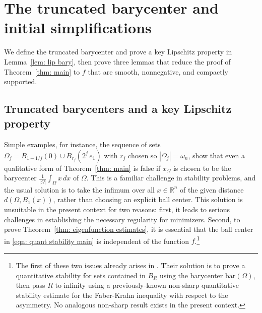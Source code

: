 \documentclass[10pt,a4paper]{amsart}
\numberwithin{equation}{section}
\def\R{{\mathbb R}}
\def\W{\Omega}
\def\om{\omega}
\begin{document}
\section{The truncated barycenter and initial simplifications}\label{sec: more preliminaries}
We define the truncated barycenter and prove a key Lipschitz property in Lemma~\ref{lem: lip bary}, then prove three lemmas that reduce the proof of  Theorem~\ref{thm: main} to $f$ that are smooth, nonnegative, and compactly supported.

 \subsection{Truncated barycenters and a key Lipschitz property}\label{sec: truncated barycenter}
\label{ssec: lip bary}
%
%
%
%
Simple examples, for instance, the sequence of sets $\Omega_j = B_{1-1/j}(0) \cup B_{r_j}(2^j\,e_1)$ with $r_j$  chosen so $|\Omega_j|= \om_n$,  show that even a qualitative form of Theorem~\ref{thm: main} is false if $x_\W$ is chosen to be the barycenter $ \tfrac{1}{|\W|}\int_\W x \,dx$ of $\W$.
This is a familiar challenge in stability problems, and the usual solution is to take the infimum over all $x \in \R^n$ of the given distance $d(\W, B_1(x))$, rather than choosing an explicit ball center. This solution is unsuitable in the present context for two reasons: first, it leads to serious challenges in establishing the necessary regularity for minimizers. 
Second, to prove Theorem~\ref{thm: eigenfunction estimates}, it is essential that the ball center in \eqref{eqn: quant stability main} is independent of the function $f$.\footnote{The first of these two issues already arises in \cite{BDV15}. 
Their solution is to prove a quantitative stability for sets contained in  $B_R$ using the barycenter $\text{bar}(\W)$, then pass $R$ to infinity using a previously-known non-sharp quantitative stability estimate \cite{FMP09} for the Faber-Krahn inequality with respect to the asymmetry. No analogous non-sharp result exists in the present context.}
\end{document}
